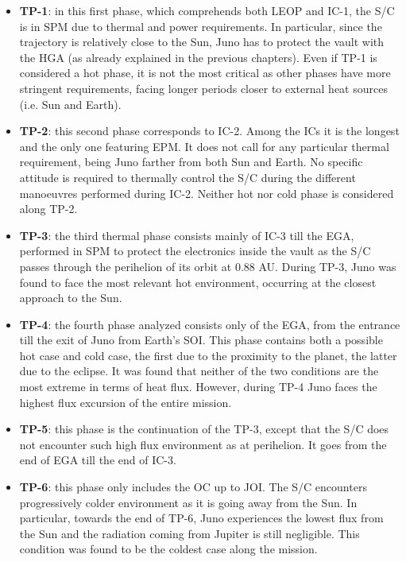 \begin{itemize}
    \item \textbf{TP-1}:
    in this first phase, which comprehends both LEOP and IC-1, the S/C is in SPM due to thermal and power requirements. In particular, since the trajectory is relatively close to the Sun, Juno has to protect the vault with the HGA (as already explained in the previous chapters).
    Even if TP-1 is considered a hot phase, it is not the most critical as other phases have more stringent requirements, facing longer periods closer to external heat sources (i.e. Sun and Earth).

    \item \textbf{TP-2}:
    this second phase corresponds to IC-2. Among the ICs it is the longest and the only one featuring EPM. It does not call for any particular thermal requirement, being Juno farther from both Sun and Earth.
    No specific attitude is required to thermally control the S/C during the different manoeuvres performed during IC-2. Neither hot nor cold phase is considered along TP-2.
    
    \item \textbf{TP-3}:
    the third thermal phase consists mainly of IC-3 till the EGA, performed in SPM to protect the electronics inside the vault as the S/C passes through the perihelion of its orbit at 0.88 AU.
    During TP-3, Juno was found to face the most relevant hot environment, occurring at the closest approach to the Sun.
    
    \item \textbf{TP-4}:
    the fourth phase analyzed consists only of the EGA, from the entrance till the exit of Juno from Earth's SOI. This phase contains both a possible hot case and cold case, the first due to the proximity to the planet, the latter due to the eclipse.
    It was found that neither of the two conditions are the most extreme in terms of heat flux. However, during TP-4 Juno faces the highest flux excursion of the entire mission.
    
    \item \textbf{TP-5}:
    this phase is the continuation of the TP-3, except that the S/C does not encounter such high flux environment as at perihelion. It goes from the end of EGA till the end of IC-3.
    
    \item \textbf{TP-6}:
    this phase only includes the OC up to JOI. The S/C encounters progressively colder environment as it is going away from the Sun.
    In particular, towards the end of TP-6, Juno experiences the lowest flux from the Sun and the radiation coming from Jupiter is still negligible. This condition was found to be the coldest case along the mission.
    

\end{itemize}
